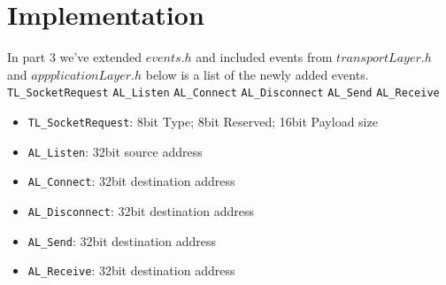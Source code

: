 \section{Implementation}


In part 3 we've extended $events.h$ and included events from $transportLayer.h$ and $appplicationLayer.h$
below is a list of the newly added events.
\break
\texttt{TL\_SocketRequest}
\break
\texttt{AL\_Listen}
\break
\texttt{AL\_Connect}
\break
\texttt{AL\_Disconnect}
\break
\texttt{AL\_Send}
\break
\texttt{AL\_Receive}
\break


\begin{itemize}
\item \texttt{TL\_SocketRequest}: 8bit Type; 8bit Reserved; 16bit Payload size
\item \texttt{AL\_Listen}: 32bit source address
\item \texttt{AL\_Connect}: 32bit destination address
\item \texttt{AL\_Disconnect}: 32bit destination address
\item \texttt{AL\_Send}: 32bit destination address
\item \texttt{AL\_Receive}: 32bit destination address
\end{itemize}


\begin{lstlisting}
\end{lstlisting}





\hfill \break

